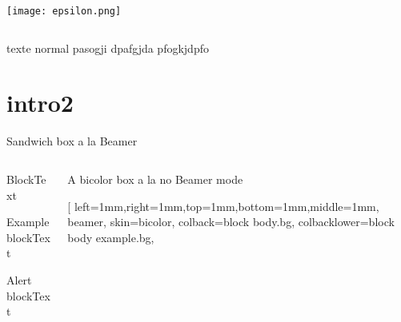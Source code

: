\documentclass[11pt, xcolor=svgnames]{beamer}
\begin{document}
\begin{darkframes}
\begin{frame}
\begin{columns}
\begin{column}{.5\textwidth}
\texttt{[image: epsilon.png]}
\end{column}
\end{columns}
texte normal pasogji dpafgjda pfogkjdpfo
\end{frame}


\section{intro2}

\begin{frame}{Sandwich box a la Beamer}
\begin{columns}[c]
\begin{column}{.3\linewidth} %
\begin{block}{Block}Text\end{block} %
\begin{exampleblock}{Example  block}Text\end{exampleblock} %
\begin{alertblock}{Alert block}Text\end{alertblock} %
\end{column}
\begin{column}{.4\linewidth}
\begin{tcolorbox}[
left=1mm,right=1mm,top=1mm,bottom=1mm,middle=1mm,
skin=bicolor,
arc=5pt, %
bottomrule=0pt,
leftrule=00pt, %
rightrule=0pt,
toprule=0pt,
colback=block body alerted.bg, %
colbacklower=block body example.bg, %
collower=block title.bg,
colframe=block title.bg!1!black, %
frame style={left color=block title.bg,
right color=block title example.bg!100!black}, %
fuzzy shadow={1mm}{-1mm}{-.25mm}{.5pt}{structure!20!black}%
,title=Testing Sans utiliser -beamer ]
A bicolor box
\tcblower
a la \dotfill \alert{no} Beamer mode 
\end{tcolorbox}
\bigskip
\begin{tcolorbox}[
left=1mm,right=1mm,top=1mm,bottom=1mm,middle=1mm, %
beamer, %
skin=bicolor,
colback=block body.bg, %
colbacklower=block body example.bg, %

\end{tcolorbox}
\end{column}
\end{columns}
\end{frame}
\end{darkframes}
\end{document}
